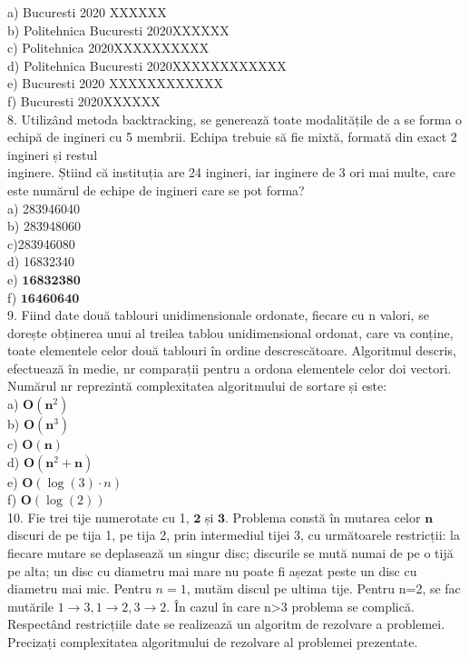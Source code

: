 \documentclass[10pt]{article}
\begin{document}
a) Bucuresti 2020 XXXXXX\\
b) Politehnica Bucuresti 2020XXXXXX\\
c) Politehnica 2020XXXXXXXXXX\\
d) Politehnica Bucuresti 2020XXXXXXXXXXXX\\
e) Bucuresti 2020 XXXXXXXXXXXX\\
f) Bucuresti 2020XXXXXX\\
8. Utilizând metoda backtracking, se generează toate modalitățile de a se forma o echipă de ingineri cu 5 membrii. Echipa trebuie să fie mixtă, formată din exact 2 ingineri și restul\\
inginere. Știind că instituția are 24 ingineri, iar inginere de 3 ori mai multe, care este numărul de echipe de ingineri care se pot forma?\\
a) 283946040\\
b) 283948060\\
c)283946080\\
d) 16832340\\
e) $\mathbf{1 6 8 3 2 3 8 0}$\\
f) $\mathbf{1 6 4 6 0 6 4 0}$\\
9. Fiind date două tablouri unidimensionale ordonate, fiecare cu n valori, se dorește obținerea unui al treilea tablou unidimensional ordonat, care va conține, toate elementele celor două tablouri în ordine descrescătoare. Algoritmul descris, efectuează în medie, nr comparații pentru a ordona elementele celor doi vectori. Numărul nr reprezintă complexitatea algoritmului de sortare și este:\\
a) $\mathbf{O}\left(\mathbf{n}^{2}\right)$\\
b) $\mathbf{O}\left(\mathbf{n}^{3}\right)$\\
c) $\mathbf{O}(\mathbf{n})$\\
d) $\mathbf{O}\left(\mathbf{n}^{2}+\mathbf{n}\right)$\\
e) $\mathbf{O}(\log (3) \cdot n)$\\
f) $\mathbf{O}(\log (2))$\\
10. Fie trei tije numerotate cu 1, $\mathbf{2}$ și $\mathbf{3}$. Problema constă în mutarea celor $\mathbf{n}$ discuri de pe tija 1, pe tija 2, prin intermediul tijei 3, cu următoarele restricții: la fiecare mutare se deplasează un singur disc; discurile se mută numai de pe o tijă pe alta; un disc cu diametru mai mare nu poate fi așezat peste un disc cu diametru mai mic. Pentru $n=1$, mutăm discul pe ultima tije. Pentru n=2, se fac mutările $1 \rightarrow 3,1 \rightarrow 2,3 \rightarrow 2$. În cazul în care n>3 problema se complică. Respectând restricțiile date se realizează un algoritm de rezolvare a problemei. Precizați complexitatea algoritmului de rezolvare al problemei prezentate.\\
\end{document}
